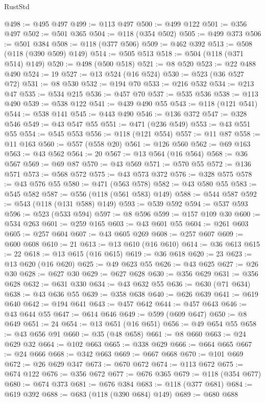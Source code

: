 \begin{lexlean}{RustStd}
\begin{coremodule}
{\begin{coremodule}
{{{{{{{{{{{{{{{{{{{{{{{{{{{{{{{@498 := @495 @497
@499 := @113 @497
@500 := @499 @122
@501 := @356 @497
@502 := @501 @365
@504 := @118 (@354 @502)
@505 := @499 @373
@506 := @501 @384
@508 := @118 (@377 @506)
@509 := @462 @392
@513 := @508 (@118 (@390 @509) @149)
@514 := @505 @513
@518 := @504 (@118 (@371 @514) @149)
@520 := @498 (@500 @518)
@521 := @8 @520
@523 := @22 @488 @490
@524 := 19
@527 := @13 @524 (@16 @524)
@530 := @523 (@36 @527 @72)
@531 := @8 @530
@532 := @194 @70
@533 := @216 @532
@534 := @213 @47
@535 := @534 @215
@536 := @457 @70
@537 := @535 @536
@538 := @113 @490
@539 := @538 @122
@541 := @439 @490 @55
@543 := @118 (@121 @541)
@544 := @538 @141
@545 := @443 @490
@546 := @136 @372
@547 := @328 @546
@549 := @43 @547 @55
@551 := @471 (@236 @549)
@553 := @43 @551 @55
@554 := @545 @553
@556 := @118 (@121 @554)
@557 := @11 @87
@558 := @11 @163
@560 := @557 (@558 @20)
@561 := @126 @560
@562 := @69 @163
@563 := @43 @562
@564 := 20
@567 := @13 @564 (@16 @564)
@568 := @36 @567
@569 := @69 @87
@570 := @43 @569
@571 := @570 @55
@572 := @136 @571
@573 := @568 @572
@575 := @43 @573 @372
@576 := @328 @575
@578 := @43 @576 @55
@580 := @471 (@563 @578)
@582 := @43 @580 @55
@583 := @545 @582
@587 := @556 (@118 (@561 @583) @149)
@588 := @544 @587
@592 := @543 (@118 (@131 @588) @149)
@593 := @539 @592
@594 := @537 @593
@596 := @523 (@533 @594)
@597 := @8 @596
@599 := @157 @109 @30
@600 := @534 @263
@601 := @259 @165
@603 := @43 @601 @55
@604 := @261 @603
@605 := @257 @604
@607 := @43 @605 @269
@608 := @257 @607
@609 := @600 @608
@610 := 21
@613 := @13 @610 (@16 @610)
@614 := @36 @613
@615 := 22
@618 := @13 @615 (@16 @615)
@619 := @36 @618
@620 := 23
@623 := @13 @620 (@16 @620)
@625 := @49 @623 @55
@626 := @43 @625
@627 := @26 @30
@628 := @627 @30
@629 := @627 @628
@630 := @356 @629
@631 := @356 @628
@632 := @631 @330
@634 := @43 @632 @55
@636 := @630 (@71 @634)
@638 := @43 @636 @55
@639 := @358 @638
@640 := @626 @639
@641 := @619 @640
@642 := @194 @641
@643 := @457 @642
@644 := @457 @643
@646 := @43 @644 @55
@647 := @614 @646
@649 := @599 (@609 @647)
@650 := @8 @649
@651 := 24
@654 := @13 @651 (@16 @651)
@656 := @49 @654 @55
@658 := @43 @656 @91
@660 := @35 (@48 @658)
@661 := @8 @660
@663 := @24 @629 @32
@664 := @102 @663
@665 := @338 @629
@666 := @664 @665
@667 := @24 @666
@668 := @342 @663
@669 := @667 @668
@670 := @101 @669
@672 := @26 @629 @347
@673 := @670 @672
@674 := @113 @672
@675 := @674 @122
@676 := @356 @672
@677 := @676 @365
@679 := @118 (@354 @677)
@680 := @674 @373
@681 := @676 @384
@683 := @118 (@377 @681)
@684 := @619 @392
@688 := @683 (@118 (@390 @684) @149)
@689 := @680 @688
}}}}}}}}}}}}}}}}}}}}}}}}}}}}}}}
\end{coremodule}}
\end{coremodule}
\end{lexlean}
